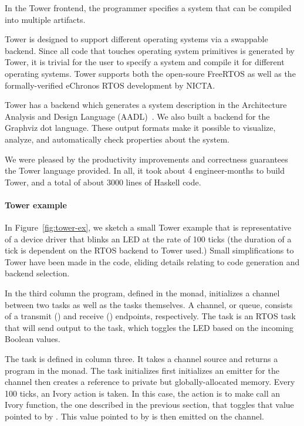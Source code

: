 In the Tower frontend, the programmer specifies a system that can be compiled into
multiple artifacts.

Tower is designed to support different operating systems via a swappable
backend. Since all code that touches operating system primitives is generated by
Tower, it is trivial for the user to specify a system and compile it for
different operating systems. Tower supports both the open-soure
FreeRTOS\cite{freertos} as well as the formally-verified
eChronos RTOS\cite{echronos} development by NICTA.


Tower has a backend which generates a system description in the Architecture
Analysis and Design Language (AADL)~\cite{SAE:AADL}. We also built a backend for
the Graphviz dot language.  These output formats make it possible to visualize,
analyze, and automatically check properties about the system.  %

We were pleased by the productivity improvements and correctness guarantees the
Tower language provided. In all, it took about 4 engineer-months to build Tower,
and a total of about 3000 lines of Haskell code.

\paragraph{Tower example}
In Figure~\ref{fig:tower-ex}, we sketch a small Tower example that is
representative of a device driver that blinks an LED at the rate of 100 ticks
(the duration of a tick is dependent on the RTOS backend to Tower used.)  Small
simplifications to Tower have been made in the code, eliding details relating to
code generation and backend selection.

In the third column the program, defined in the  monad, initializes a
channel between two tasks as well as the tasks themselves.  A channel, or queue,
consists of a transmit () and receive () endpoints, respectively.
The  task is an RTOS task that will send output to the
 task, which toggles the LED based on the incoming Boolean
values.

The  task is defined in column three.  It takes a channel source and
returns a program in the  monad.  The task initializes first
initializes an emitter for the channel then creates a reference to private but
globally-allocated memory.  Every 100 ticks, an Ivory action is taken.  In this
case, the action is to make call an Ivory function, the one described in the
previous section, that toggles that value pointed to by .  This value
pointed to by  is then emitted on the channel.

